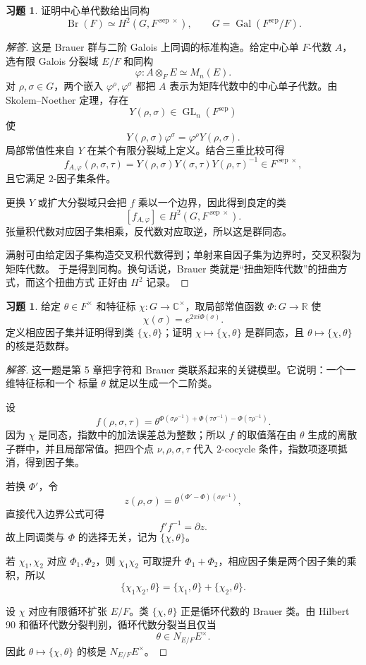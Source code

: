 \documentclass[11pt,a4paper,openany]{ctexbook}
\numberwithin{equation}{chapter}
\newcommand{\R}{\mathbb{R}}
\newcommand{\C}{\mathbb{C}}
\theoremstyle{plain}
\theoremstyle{definition}
\newtheorem{exercise}[theorem]{习题}
\theoremstyle{remark}
\begin{document}
\begin{exercise}
证明中心单代数给出同构
\[
 \operatorname{Br}(F)\simeq H^2(G,F^{\operatorname{sep}\times}),
\qquad
 G=\operatorname{Gal}(F^{\operatorname{sep}}/F).
\]
\end{exercise}

\begin{proof}[解答]
这是 Brauer 群与二阶 Galois 上同调的标准构造。给定中心单 $F$-代数 $A$，选有限 Galois 分裂域 $E/F$ 和同构
\[
 \varphi:A\otimes_FE\simeq M_n(E).
\]
对 $\rho,\sigma\in G$，两个嵌入 $\varphi^\rho,\varphi^\sigma$ 都把 $A$ 表示为矩阵代数中的中心单子代数。由 Skolem--Noether 定理，存在
\[
 Y(\rho,\sigma)\in \operatorname{GL}_n(F^{\operatorname{sep}})
\]
使
\[
 Y(\rho,\sigma)\varphi^\sigma=\varphi^\rho Y(\rho,\sigma).
\]
局部常值性来自 $Y$ 在某个有限分裂域上定义。结合三重比较可得
\[
 f_{A,\varphi}(\rho,\sigma,\tau)
 =
 Y(\rho,\sigma)Y(\sigma,\tau)Y(\rho,\tau)^{-1}
 \in F^{\operatorname{sep}\times},
\]
且它满足 $2$-因子集条件。

更换 $Y$ 或扩大分裂域只会把 $f$ 乘以一个边界，因此得到良定的类
\[
 [f_{A,\varphi}]\in H^2(G,F^{\operatorname{sep}\times}).
\]
张量积代数对应因子集相乘，反代数对应取逆，所以这是群同态。

满射可由给定因子集构造交叉积代数得到；单射来自因子集为边界时，交叉积裂为矩阵代数。
于是得到同构。换句话说，Brauer 类就是“扭曲矩阵代数”的扭曲方式，而这个扭曲方式
正好由 $H^2$ 记录。
\end{proof}

\begin{exercise}
给定 $\theta\in F^\times$ 和特征标 $\chi:G\to\C^\times$，取局部常值函数 $\Phi:G\to\R$ 使
\[
 \chi(\sigma)=e^{2\pi i\Phi(\sigma)}.
\]
定义相应因子集并证明得到类 $\{\chi,\theta\}$；证明 $\chi\mapsto\{\chi,\theta\}$ 是群同态，且 $\theta\mapsto\{\chi,\theta\}$ 的核是范数群。
\end{exercise}

\begin{proof}[解答]
这一题是第 5 章把字符和 Brauer 类联系起来的关键模型。它说明：一个一维特征标和一个
标量 $\theta$ 就足以生成一个二阶类。

设
\[
 f(\rho,\sigma,\tau)
 =
 \theta^{\Phi(\sigma\rho^{-1})+\Phi(\tau\sigma^{-1})-\Phi(\tau\rho^{-1})}.
\]
因为 $\chi$ 是同态，指数中的加法误差总为整数；所以 $f$ 的取值落在由 $\theta$ 生成的离散子群中，并且局部常值。把四个点 $\nu,\rho,\sigma,\tau$ 代入 $2$-cocycle 条件，指数项逐项抵消，得到因子集。

若换 $\Phi'$，令
\[
 z(\rho,\sigma)=
 \theta^{(\Phi'-\Phi)(\sigma\rho^{-1})},
\]
直接代入边界公式可得
\[
 f'f^{-1}=\partial z.
\]
故上同调类与 $\Phi$ 的选择无关，记为 $\{\chi,\theta\}$。

若 $\chi_1,\chi_2$ 对应 $\Phi_1,\Phi_2$，则 $\chi_1\chi_2$ 可取提升 $\Phi_1+\Phi_2$，相应因子集是两个因子集的乘积，所以
\[
 \{\chi_1\chi_2,\theta\}=\{\chi_1,\theta\}+\{\chi_2,\theta\}.
\]

设 $\chi$ 对应有限循环扩张 $E/F$。类 $\{\chi,\theta\}$ 正是循环代数的 Brauer 类。由 Hilbert 90 和循环代数分裂判别，循环代数分裂当且仅当
\[
 \theta\in N_{E/F}E^\times.
\]
因此 $\theta\mapsto\{\chi,\theta\}$ 的核是 $N_{E/F}E^\times$。
\end{proof}
\end{document}
